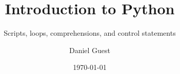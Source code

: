 \documentclass{beamer}
\title{Introduction to Python}
\subtitle{Scripts, loops, comprehensions, and control statements}
\author{Daniel Guest}
\date{\today}
\begin{document}
\begin{frame}
	\titlepage
\end{frame}

\tableofcontents
\end{document}
